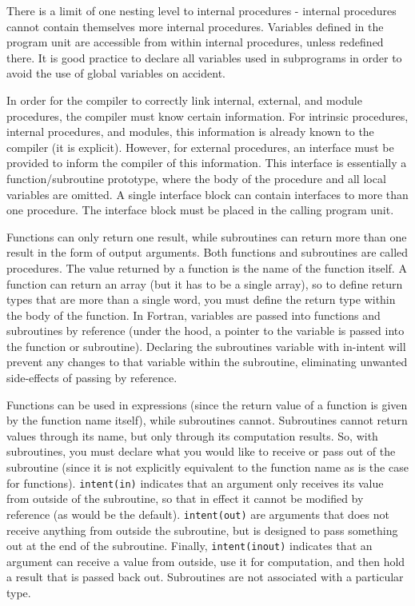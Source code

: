 \documentclass[10pt]{article}
\begin{document}
There is a limit of one nesting level to internal procedures - internal procedures cannot contain themselves more internal procedures. Variables defined in the program unit are accessible from within internal procedures, unless redefined there. It is good practice to declare all variables used in subprograms in order to avoid the use of global variables on accident.

In order for the compiler to correctly link internal, external, and module procedures, the compiler must know certain information. For intrinsic procedures, internal procedures, and modules, this information is already known to the compiler (it is explicit). However, for external procedures, an interface must be provided to inform the compiler of this information. This interface is essentially a function/subroutine prototype, where the body of the procedure and all local variables are omitted. A single interface block can contain interfaces to more than one procedure. The interface block must be placed in the calling program unit.



Functions can only return one result, while subroutines can return more than one result in the form of output arguments. Both functions and subroutines are called procedures. The value returned by a function is the name of the function itself. A function can return an array (but it has to be a single array), so to define return types that are more than a single word, you must define the return type within the body of the function. In Fortran, variables are passed into functions and subroutines by reference (under the hood, a pointer to the variable is passed into the function or subroutine). Declaring the subroutines variable with in-intent will prevent any changes to that variable within the subroutine, eliminating unwanted side-effects of passing by reference.

Functions can be used in expressions (since the return value of a function is given by the function name itself), while subroutines cannot. Subroutines cannot return values through its name, but only through its computation results. So, with subroutines, you must declare what you would like to receive or pass out of the subroutine (since it is not explicitly equivalent to the function name as is the case for functions). {\tt intent(in)} indicates that an argument only receives its value from outside of the subroutine, so that in effect it cannot be modified by reference (as would be the default). {\tt intent(out)} are arguments that does not receive anything from outside the subroutine, but is designed to pass something out at the end of the subroutine. Finally, {\tt intent(inout)} indicates that an argument can receive a value from outside, use it for computation, and then hold a result that is passed back out. Subroutines are not associated with a particular type.
\end{document}
